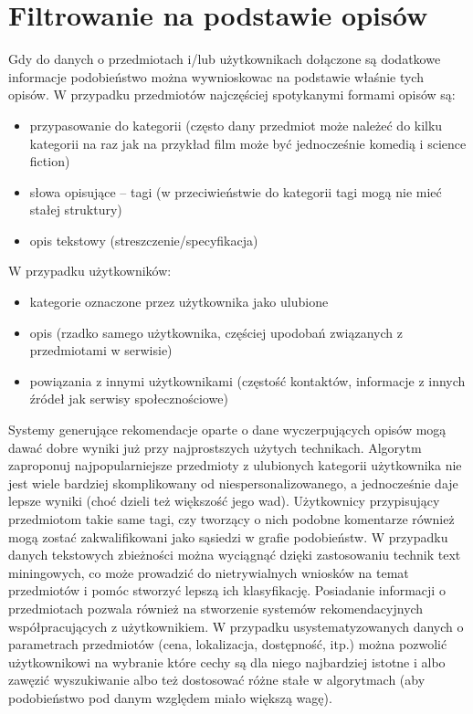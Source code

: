 \documentclass{pracamgr}
\begin{document}
  \section{Filtrowanie na podstawie opisów}
   Gdy do danych o przedmiotach i/lub użytkownikach dołączone są dodatkowe informacje podobieństwo
   można wywnioskowac na podstawie właśnie tych opisów.\newline
   W przypadku przedmiotów najczęściej spotykanymi formami opisów są:
   \begin{itemize}\itemsep1pt \parskip0pt 
    \item przypasowanie do kategorii
     (często dany przedmiot może należeć do kilku kategorii na raz jak na przykład film może być jednocześnie komedią i science fiction)
    \item słowa opisujące -- tagi (w przeciwieństwie do kategorii tagi mogą nie mieć stałej struktury)
    \item opis tekstowy (streszczenie/specyfikacja)
   \end{itemize}
   W przypadku użytkowników:
   \begin{itemize}\itemsep1pt \parskip0pt 
    \item kategorie oznaczone przez użytkownika jako ulubione
    \item opis (rzadko samego użytkownika, częściej upodobań związanych z przedmiotami w serwisie)
    \item powiązania z innymi użytkownikami (częstość kontaktów, informacje z innych źródeł jak serwisy społecznościowe)
   \end{itemize}
   Systemy generujące rekomendacje oparte o dane wyczerpujących opisów mogą dawać dobre wyniki już przy najprostszych użytych technikach.
   Algorytm zaproponuj najpopularniejsze przedmioty z ulubionych kategorii użytkownika nie jest wiele bardziej skomplikowany od niespersonalizowanego,
   a jednocześnie daje lepsze wyniki (choć dzieli też większość jego wad).
   Użytkownicy przypisujący przedmiotom takie same tagi, czy tworzący o
   nich podobne komentarze również mogą zostać zakwalifikowani jako sąsiedzi w grafie podobieństw.
   W przypadku danych tekstowych zbieżności można wyciągnąć dzięki zastosowaniu technik text miningowych,
   co może prowadzić do nietrywialnych wniosków na temat przedmiotów i pomóc stworzyć lepszą ich klasyfikację.\newline
   Posiadanie informacji o przedmiotach pozwala również na stworzenie systemów rekomendacyjnych współpracujących z użytkownikiem.
   W przypadku usystematyzowanych danych o parametrach przedmiotów (cena, lokalizacja, dostępność, itp.)
   można pozwolić użytkownikowi na wybranie które cechy są dla niego najbardziej istotne i albo zawęzić wyszukiwanie albo też
   dostosować różne stałe w algorytmach (aby podobieństwo pod danym względem miało większą wagę).
\end{document}
